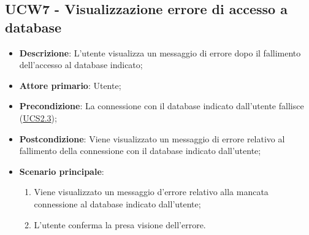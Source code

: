 \subsection{UCW7 - Visualizzazione errore di accesso a database}
\label{sub:ucw7}
\begin{itemize}
    \item \textbf{Descrizione}: L'utente visualizza un messaggio di errore dopo il fallimento dell'accesso
    al database indicato;

    \item \textbf{Attore primario}: Utente;
    
    \item \textbf{Precondizione}:   La connessione con il database indicato dall'utente fallisce 
    (\hyperref[ssub:ucs2.3]{UCS2.3});

    \item \textbf{Postcondizione}:  Viene visualizzato un messaggio di errore relativo al fallimento della connessione 
    con il database indicato dall'utente;

    \item \textbf{Scenario principale}:
    \begin{enumerate}
        \item Viene visualizzato un messaggio d'errore relativo alla mancata connessione al database indicato dall'utente;
        \item L'utente conferma la presa visione dell'errore.
    \end{enumerate}
\end{itemize}